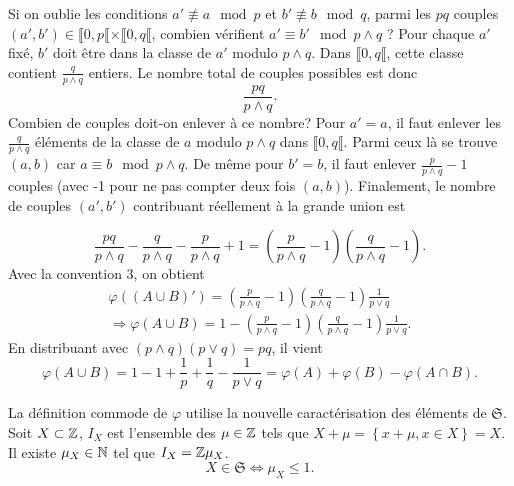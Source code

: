 \begin{enumerate}
Si on oublie les conditions $a'\not \equiv a \mod p$ et $b'\not \equiv b \mod q$, parmi les $pq$ couples $(a',b')\in \llbracket 0,p\llbracket \times \llbracket 0,q\llbracket$, combien vérifient $a' \equiv b' \mod p \wedge q$ ? \newline
Pour chaque $a'$ fixé, $b'$ doit être dans la classe de $a'$ modulo $p\wedge q$. Dans $\llbracket 0, q \llbracket$, cette classe contient $\frac{q}{p \wedge q}$ entiers. Le nombre total de couples possibles est donc
\begin{displaymath}
  \frac{pq}{p \wedge q}.
\end{displaymath}
Combien de couples doit-on enlever à ce nombre?\newline
Pour $a' = a$, il faut enlever les $\frac{q}{p \wedge q}$ éléments de la classe de $a$ modulo $p \wedge q$ dans $\llbracket 0, q\llbracket$. Parmi ceux là se trouve $(a,b)$ car $a \equiv b \mod p\wedge q$. De même pour $b' = b$, il faut enlever $\frac{p}{p \wedge q}-1$ couples (avec -1 pour ne pas compter deux fois $(a,b)$).\newline
Finalement, le nombre de couples $(a',b')$ contribuant réellement à la grande union est

\begin{displaymath}
  \frac{pq}{p \wedge q} - \frac{q}{p \wedge q} - \frac{p}{p \wedge q} + 1 = \left(\frac{p}{p \wedge q}-1\right) \left(\frac{q}{p \wedge q}-1\right).
\end{displaymath}
Avec la convention 3, on obtient
\begin{multline*}
  \varphi((A \cup B)') = \left(\frac{p}{p \wedge q}-1\right) \left(\frac{q}{p \wedge q}-1\right) \frac{1}{p \vee q}\\
  \Rightarrow
  \varphi(A \cup B) = 1 - \left(\frac{p}{p \wedge q}-1\right) \left(\frac{q}{p \wedge q}-1\right) \frac{1}{p \vee q}.
\end{multline*}
En distribuant avec $(p \wedge q)(p \vee q) = pq$, il vient
\begin{displaymath}
  \varphi(A \cup B) = 1 - 1 + \frac{1}{p} + \frac{1}{q} - \frac{1}{p \vee q} = \varphi(A) + \varphi(B) - \varphi(A\cap B).
\end{displaymath}
\end{enumerate}

La définition commode de $\varphi$ utilise la nouvelle caractérisation des éléments de $\mathfrak{S}$.\newline
Soit $X \subset \mathbb{Z}$, $I_X$ est l'ensemble des $\mu \in \mathbb{Z}$ tels que $X + \mu =\left\lbrace x + \mu , x\in X\right\rbrace = X$. Il existe $\mu_X \in \mathbb{N}$ tel que $I_X = \mathbb{Z} \mu_X$.
\begin{displaymath}
  X \in \mathfrak{S} \Leftrightarrow \mu_X \leq 1 .
\end{displaymath}

